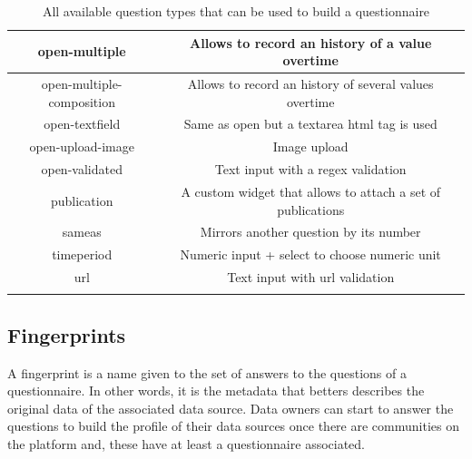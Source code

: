 \begin{longtable}[c]{|c|c|}
open-multiple                     & Allows to record an history of a value overtime             \\ \hline
open-multiple-composition         & Allows to record an history of several values overtime      \\ \hline
open-textfield                    & Same as open but a textarea html tag is used                \\ \hline
open-upload-image                 & Image upload                                                \\ \hline
open-validated                    & Text input with a regex validation                          \\ \hline
publication                       & A custom widget that allows to attach a set of publications \\ \hline
sameas                            & Mirrors another question by its number                      \\ \hline
timeperiod                        & Numeric input + select to choose numeric unit               \\ \hline
url                               & Text input with url validation                              \\ \hline
\caption{All available question types that can be used to build a questionnaire}
\label{tab:original-question-types}\\
\end{longtable}

\subsection{Fingerprints}


A fingerprint is a name given to the set of answers to the questions of a questionnaire.
In other words, it is the metadata that betters describes the original data of the associated data source.
Data owners can start to answer the questions to build the profile of their data sources once there are communities on the platform and, these have at least a questionnaire associated.


